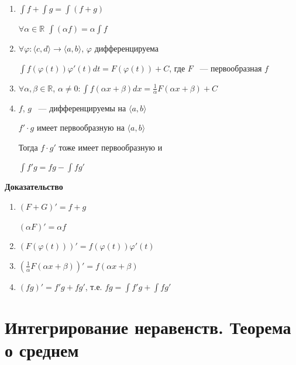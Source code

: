 \documentclass{article}
\begin{document}
		\begin{enumerate}
		
			\item $\int f + \int g  = \int (f + g)$
			
				$\forall \alpha \in \mathbb{R}$ $\int(\alpha f) = \alpha \int{f}$
				
			\item $\forall \varphi: \langle c, d \rangle \rightarrow \langle a, b \rangle$, $\varphi$ дифференцируема
			
				$\int f(\varphi(t))\varphi'(t)dt = F(\varphi(t)) + C$, где $F$ ~--- первообразная $f$
				
			\item $\forall \alpha, \beta \in \mathbb{R}$, $\alpha \neq 0 : \int f(\alpha x + \beta)dx = \frac{1}{\alpha} F(\alpha x + \beta) + C$
			
			\item $f$, $g$ ~--- дифференцируемы на $\langle a, b \rangle$
			
				$f' \cdot g$ имеет первообразную на $\langle a, b \rangle$
				
				Тогда $f \cdot g'$ тоже имеет первообразную и 
				
				$\int f'g = fg - \int fg'$
				
		\end{enumerate}
			
		\textbf{Доказательство}
		
		\begin{enumerate}
		
			\item $(F + G)' = f + g$
			
				$(\alpha F)' = \alpha f$
				
			\item $(F(\varphi(t)))' = f(\varphi(t))\varphi'(t)$
			
			\item $(\frac{1}{\alpha} F (\alpha x + \beta))' = f(\alpha x + \beta)$
			
			\item $(fg)' = f'g + fg'$, т.е. $fg = \int f'g + \int fg'$
			
		\end{enumerate}
		
	\newpage
	
	\section{Интегрирование неравенств. Теорема о среднем}
	
\end{document}
